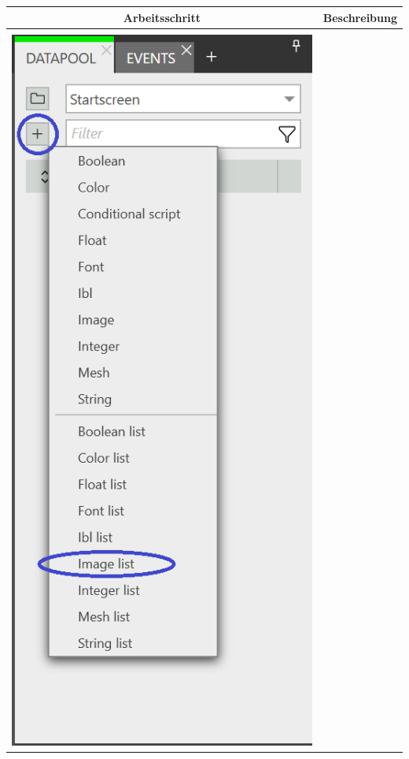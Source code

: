 \newpage

\begin{longtable}[H] { c | m{5cm} }
\hline
Arbeitsschritt & Beschreibung \\ \hline 
\\
  \centering
    \begin{minipage}{.25\textwidth}
      \includegraphics[width=\linewidth]{figures/ImageList_01.PNG}

\end{minipage}
\end{longtable}
